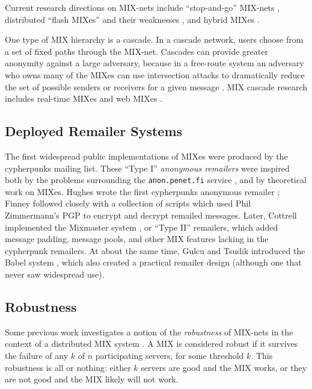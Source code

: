 \documentclass{llncs}
\begin{document}
Current research directions on MIX-nets include ``stop-and-go'' MIX-nets
\cite{kesdogan}, distributed ``flash MIXes'' \cite{flash-mix} and their
weaknesses \cite{desmedt,mitkuro}, and hybrid MIXes \cite{hybrid-mix}.

One type of MIX hierarchy is a cascade.
In a cascade network, users choose from a set of fixed paths through
the MIX-net. Cascades can provide greater anonymity against a large
adversary, because in a free-route system an
adversary who owns many of the MIXes can use intersection attacks to
dramatically reduce the set of possible senders or receivers for a given
message \cite{disad-free-routes}.
MIX cascade research includes real-time MIXes \cite{realtime-mix} and
web MIXes \cite{web-mix}.

\subsection{Deployed Remailer Systems}

The first widespread public implementations of MIXes were produced by the
cypherpunks mailing list. These ``Type I'' \emph{anonymous remailers}
were inspired both by the problems surrounding the {\tt anon.penet.fi}
service \cite{helsingius}, and by theoretical work on MIXes. Hughes wrote
the first cypherpunks anonymous remailer \cite{remailer-history}; Finney
followed closely with a collection of scripts which used Phil Zimmermann's
PGP to encrypt and decrypt remailed messages. Later, Cottrell implemented
the Mixmaster system \cite{mixmaster}, or ``Type II'' remailers, which
added message padding, message pools, and other MIX features lacking
in the cypherpunk remailers. At about the same time, Gulcu and Tsudik
introduced the Babel system \cite{babel}, which also created a practical
remailer design (although one that never saw widespread use).

\subsection{Robustness}

Some previous work investigates a notion of the \emph{robustness}
of MIX-nets in the context of a distributed MIX system
\cite{flash-mix}. A MIX is considered robust if it survives the
failure of any $k$ of $n$ participating servers, for some threshold
$k$. This robustness is all or nothing: either $k$ servers are
good and the MIX works, or they are not good and the MIX likely will
not work.
\end{document}
